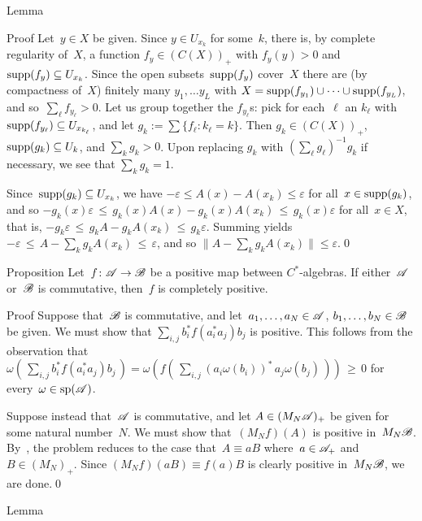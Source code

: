 \documentclass[a]{subfiles}
\begin{document}
\begin{parsec}
\begin{point}{Lemma}
\begin{point}{Proof}
Let~$y\in X$ be given. Since $y\in U_{x_k}$
for some~$k$, there is, by complete regularity of~$X$,
a function $f_y\in (C(X))_+$
with $f_y(y)>0$
and $\operatorname{supp}(f_y)\subseteq U_{x_k}$.
Since the open subsets~$\operatorname{supp}(f_y)$
cover~$X$
there are (by compactness of~$X$) finitely many $y_1,\dotsc y_L$
with $X = \operatorname{supp}(f_{y_1})\cup \dotsb \cup \operatorname{supp}(f_{y_L})$,
and so~$\sum_\ell f_{y_\ell} > 0$.
Let us group together the $f_{y_\ell}$s:
pick for each~$\ell$ an $k_\ell$ with $\operatorname{supp}(f_{y_\ell})\subseteq 
U_{x_{k_\ell}}$,
and let $g_k:= \sum\{f_\ell\colon k_\ell = k\}$.
Then $g_k\in (C(X))_+$,
$\operatorname{supp}(g_k)\subseteq U_k$,
and $\sum_k g_k >0$.
	Upon replacing $g_k$ with $(\sum_\ell g_\ell)^{-1} g_k$ if necessary,
we see that $\sum_k g_k=1$.

Since~$\operatorname{supp}(g_k)\subseteq U_{x_k}$,
we have $-\varepsilon \leq A(x)-A(x_k)\leq \varepsilon$
for all~$x\in \operatorname{supp}(g_k)$,
and so  $-g_k(x) \varepsilon
\,\leq\, g_k(x) A(x) - g_k(x) A(x_k)\,\leq\, g_k(x) \varepsilon$
for all~$x\in X$,
that is,  $-g_k \varepsilon
\,\leq\, g_k A - g_k A(x_k)\,\leq\, g_k \varepsilon$.
Summing yields
$-\varepsilon \,\leq\, A- \sum_k g_k A(x_k)\,\leq\, \varepsilon$,
and so $\|A-\sum_k g_k A(x_k)\|\leq \varepsilon$.\qed
\end{point}
\end{point}
\begin{point}[cp-commutative]{Proposition}%
Let~$f\colon \mathscr{A}\to\mathscr{B}$ be a 
positive map between $C^*$-algebras.
If either~$\mathscr{A}$ or~$\mathscr{B}$ is commutative,
then~$f$ is completely positive.
\begin{point}{Proof}%
Suppose that~$\mathscr{B}$ is commutative,
and let~$a_1,\dotsc,a_N\in \mathscr{A}$,
$b_1,\dotsc,b_N\in\mathscr{B}$ be given.
We must
show that $\sum_{i,j} b_i^*f(a_i^*a_j)b_j$ is positive.
This follows from the observation that
$\omega(\,\sum_{i,j} b_i^*f(a_i^*a_j)b_j\,)
= \omega(f(\,\sum_{i,j}(a_i\omega(b_i))^*\,a_j \omega(b_j)\,))\,\geq \,0$
for every~$\omega\in\mathrm{sp}(\mathscr{A})$.
\begin{point}%
Suppose instead that~$\mathscr{A}$ is commutative,
and let $A\in (M_N\mathscr{A})_+$
be given for some natural number~$N$.
We must show that~$(M_Nf)(A)$ is positive in~$M_N\mathscr{B}$.
By~,
the problem reduces to the case that~$A\equiv a B$
where~$a\in \mathscr{A}_+$ and~$B\in (M_N)_+$.
Since $(M_Nf)(aB)\equiv f(a)B$ is clearly positive
in~$M_N\mathscr{B}$,
we are done.\qed
\end{point}
\end{point}
\end{point}
\begin{point}{Lemma}%

\end{point}
\end{parsec}
\end{document}
